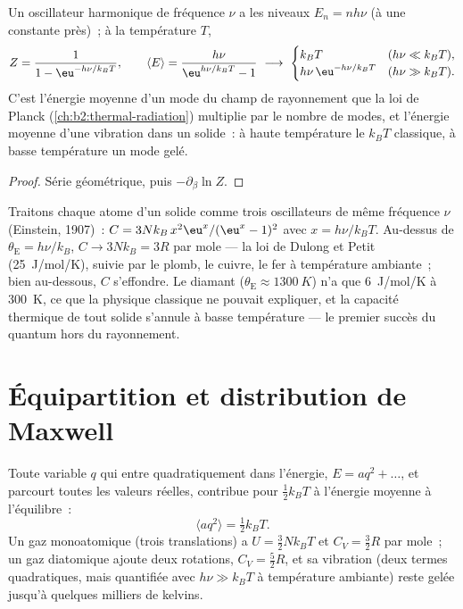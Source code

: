 \begin{proposition}\label{prop:b2:boltzmann-factor:oscillator}
Un oscillateur harmonique de fréquence $\nu$ a les niveaux $E_n = nh\nu$ (à
une constante près)~; à la température $T$,
\[
Z = \frac{1}{1 - \eu^{-h\nu/k_BT}}, \qquad
\langle E\rangle = \frac{h\nu}{\eu^{h\nu/k_BT} - 1}
\ \longrightarrow\
\begin{cases} k_BT & (h\nu \ll k_BT), \\ h\nu\,\eu^{-h\nu/k_BT} & (h\nu \gg k_BT). \end{cases}
\]
C'est l'énergie moyenne d'un mode du champ de rayonnement que la loi de
Planck (\cref{ch:b2:thermal-radiation}) multiplie par le nombre de modes,
et l'énergie moyenne d'une vibration dans un solide~: à haute température le
$k_BT$ classique, à basse température un mode gelé.
\end{proposition}

\begin{proof}
Série géométrique, puis $-\partial_\beta\ln Z$.
\end{proof}

\begin{example}\label{ex:b2:boltzmann-factor:einstein}
Traitons chaque atome d'un solide comme trois oscillateurs de même fréquence
$\nu$ (Einstein, 1907)~: $C = 3Nk_B\,x^2\eu^x/(\eu^x - 1)^2$ avec $x =
h\nu/k_BT$. Au-dessus de $\theta_{\text{E}} = h\nu/k_B$, $C \to 3Nk_B = 3R$ par mole
--- la loi de Dulong et Petit (\qty{25}{J/mol/K}), suivie par le plomb, le
cuivre, le fer à température ambiante~; bien au-dessous, $C$ s'effondre. Le diamant
($\theta_{\text{E}} \approx \qty{1300}{K}$) n'a que \qty{6}{J/mol/K} à
\qty{300}{K}, ce que la physique classique ne pouvait expliquer, et la capacité thermique de
tout solide s'annule à basse température --- le premier succès du
quantum hors du rayonnement.
\end{example}

\section{Équipartition et distribution de Maxwell}

\begin{theorem}\label{thm:b2:boltzmann-factor:equipartition}
Toute variable $q$ qui entre quadratiquement dans l'énergie, $E = aq^2 +
\dots$, et parcourt toutes les valeurs réelles, contribue pour $\tfrac12k_BT$ à
l'énergie moyenne à l'équilibre~:
\[
\langle aq^2\rangle = \tfrac12k_BT .
\]
Un gaz monoatomique (trois translations) a $U = \tfrac32Nk_BT$ et $C_V =
\tfrac32R$ par mole~; un gaz diatomique ajoute deux rotations, $C_V = \tfrac52R$,
et sa vibration (deux termes quadratiques, mais quantifiée avec $h\nu \gg
k_BT$ à température ambiante) reste gelée jusqu'à quelques milliers de kelvins.
\end{theorem}

